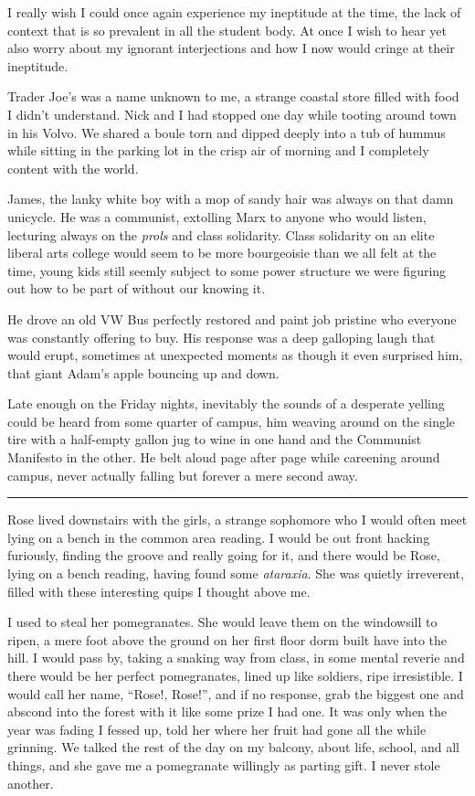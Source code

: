 \documentclass[ebook, 10pt, openright, onecolumn]{memoir}
\newcommand*\td[1]{
  \todo[inline]{
     #1 
  }
}
\newcommand*\starbreak{\fancybreak*{\Large{* * *}}}
\newcommand*\finish{\td{ ----- Finish this section -----}}
\begin{document}
I really wish I could once again experience my ineptitude at the time, the lack
of context that is so prevalent in all the student body.  At once I wish to hear
yet also worry about my ignorant interjections and how I now would cringe at their
ineptitude.  

\finish

Trader Joe's was a name unknown to me, a strange coastal store filled with food
I didn't understand.  Nick and I had stopped one day while tooting around town
in his Volvo.  We shared a boule torn and dipped deeply into a tub of hummus
while sitting in the parking lot in the crisp air of morning and I completely
content with the world.  

James, the lanky white boy with a mop of sandy hair was always on that damn
unicycle.  He was a communist, extolling Marx to anyone who would listen,
lecturing always on the \textit{prols} and class solidarity.  Class solidarity
on an elite liberal arts college would seem to be more bourgeoisie than we all
felt at the time, young kids still seemly subject to some power structure we
were figuring out how to be part of without our knowing it.  

He drove an old VW Bus perfectly restored and paint job pristine who everyone
was constantly offering to buy.  His response was a deep galloping laugh that
would erupt, sometimes at unexpected moments as though it even surprised him,
that giant Adam's apple bouncing up and down.  

Late enough on the Friday nights, inevitably the sounds of a desperate yelling
could be heard from some quarter of campus, him weaving around on the single
tire with a half-empty gallon jug to wine in one hand and the Communist
Manifesto in the other.  He belt aloud page after page while careening around
campus, never actually falling but forever a mere second away.

\starbreak

Rose lived downstairs with the girls, a strange sophomore who I would often meet
lying on a bench in the common area reading.  I would be out front hacking
furiously, finding the groove and really going for it, and there would be Rose,
lying on a bench reading, having found some \textit{ataraxia}.  She was quietly
irreverent, filled with these interesting quips I thought above me.  

I used to steal her pomegranates.  She would leave them on the windowsill to
ripen, a mere foot above the ground on her first floor dorm built have into the
hill.  I would pass by, taking a snaking way from class, in some mental reverie
and there would be her perfect pomegranates, lined up like soldiers, ripe
irresistible.  I would call her name, ``Rose!, Rose!'', and if no response, grab
the biggest one and abscond into the forest with it like some prize I had one.
It was only when the year was fading I fessed up, told her where her fruit had
gone all the while grinning.  We talked the rest of the day on my balcony, about
life, school, and all things, and she gave me a pomegranate willingly as parting
gift.  I never stole another.
\end{document}
